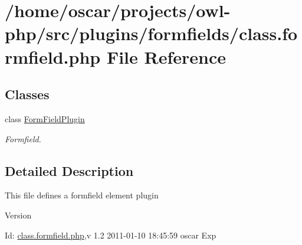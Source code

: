 \section{/home/oscar/projects/owl-\/php/src/plugins/formfields/class.formfield.php File Reference}
\label{class_8formfield_8php}
\subsection*{Classes}
\begin{DoxyCompactItemize}
\item 
class \hyperlink{classFormFieldPlugin}{FormFieldPlugin}
\begin{DoxyCompactList}\small\item\em Formfield. \item\end{DoxyCompactList}\end{DoxyCompactItemize}


\subsection{Detailed Description}
This file defines a formfield element plugin \begin{DoxyVersion}{Version}

\end{DoxyVersion}
\begin{DoxyParagraph}{Id:}
\hyperlink{class_8formfield_8php}{class.formfield.php},v 1.2 2011-\/01-\/10 18:45:59 oscar Exp 
\end{DoxyParagraph}
